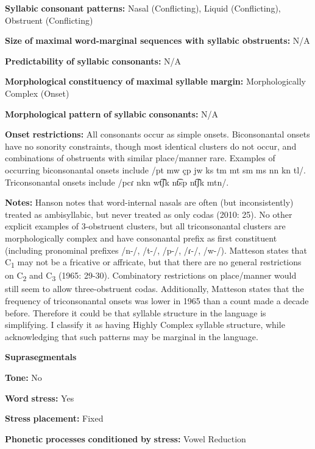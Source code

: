 \begin{styleBody}
\textbf{Syllabic} \textbf{consonant} \textbf{patterns:} Nasal (Conflicting), Liquid (Conflicting), Obstruent (Conflicting)

\textbf{Size} \textbf{of} \textbf{maximal} \textbf{word{}-marginal sequences with syllabic obstruents:} N/A

\textbf{Predictability} \textbf{of} \textbf{syllabic} \textbf{consonants:} N/A

\textbf{Morphological} \textbf{constituency} \textbf{of} \textbf{maximal} \textbf{syllable} \textbf{margin:} Morphologically Complex (Onset)

\textbf{Morphological} \textbf{pattern} \textbf{of} \textbf{syllabic} \textbf{consonants:} N/A

\textbf{Onset} \textbf{restrictions:} All consonants occur as simple onsets. Biconsonantal onsets have no sonority constraints, though most identical clusters do not occur, and combinations of obstruents with similar place/manner rare. Examples of occurring biconsonantal onsets include /pt mw çp jw ks tm mt sm ms nn kn tl/. Triconsonantal onsets include /pcɾ nkn wt͡ʃk nt͡sp nt͡ʃk mtn/.

\textbf{Notes:} Hanson notes that word-internal nasals are often (but inconsistently) treated as ambisyllabic, but never treated as only codas (2010: 25). No other explicit examples of 3-obstruent clusters, but all triconsonantal clusters are morphologically complex and have consonantal prefix as first constituent (including pronominal prefixes /n-/, /t-/, /p-/, /ɾ{}-/, /w-/). Matteson states that C\textsubscript{1} may not be a fricative or affricate, but that there are no general restrictions on C\textsubscript{2} and C\textsubscript{3} (1965: 29-30). Combinatory restrictions on place/manner would still seem to allow three-obstruent codas. Additionally, Matteson states that the frequency of triconsonantal onsets was lower in 1965 than a count made a decade before. Therefore it could be that syllable structure in the language is simplifying. I classify it as having Highly Complex syllable structure, while acknowledging that such patterns may be marginal in the language.

\textbf{Suprasegmentals}

\textbf{Tone:} No

\textbf{Word} \textbf{stress:} Yes

\textbf{Stress} \textbf{placement:} Fixed

\textbf{Phonetic} \textbf{processes} \textbf{conditioned} \textbf{by} \textbf{stress:} Vowel Reduction


\end{styleBody}
